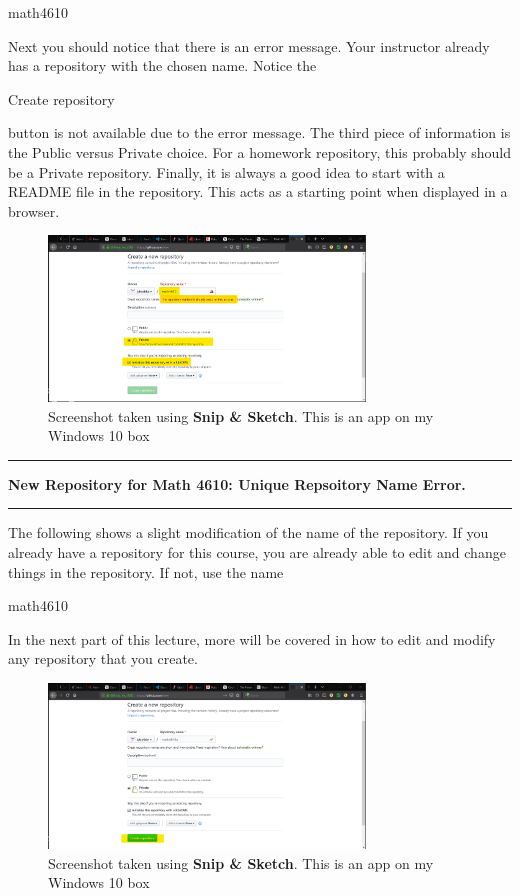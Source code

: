 \documentclass[10pt,fleqn]{article}
\begin{document}
     math4610

Next you should notice that there is an error message. Your instructor already
has a repository with the chosen name. Notice the

     Create repository

button is not available due to the error message. The third piece of information
is the Public versus Private choice. For a homework repository, this probably
should be a Private repository. Finally, it is always a good idea to start with
a README file in the repository. This acts as a starting point when displayed in
a browser. 
\vfill
\begin{figure}[h]
\centering
\includegraphics[width=0.75\textwidth]{../images/newrepository_04.png}
\caption{{Screenshot} taken using {\bf Snip \& Sketch}. This is an app on
         my Windows 10 box}
\end{figure}
\eject
\vskip0.1in\hrule\vskip0.1in
\noindent
{\bf New Repository for Math 4610: Unique Repsoitory Name Error.} 
\vskip0.1in\hrule\vskip0.1in
The following shows a slight modification of the name of the repository. If you
already have a repository for this course, you are already able to edit and
change things in the repository. If not, use the name 

     math4610

In the next part of this lecture, more will be covered in how to edit and modify
any repository that you create.
\vfill
\begin{figure}[h]
\centering
\includegraphics[width=0.75\textwidth]{../images/newrepository_05.png}
\caption{{Screenshot} taken using {\bf Snip \& Sketch}. This is an app on
         my Windows 10 box}
\end{figure}
\eject
\end{document}
